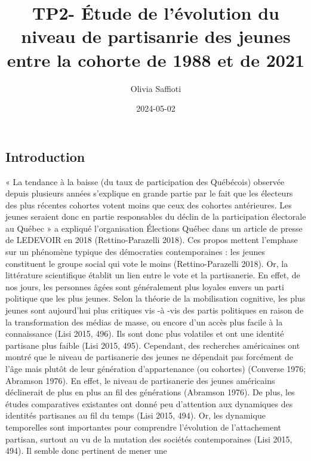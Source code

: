 \documentclass[
  letterpaper,
  DIV=11,
  numbers=noendperiod]{scrartcl}
\title{TP2- Étude de l'évolution du niveau de partisanrie des jeunes
entre la cohorte de 1988 et de 2021}
\author{Olivia Saffioti}
\date{2024-05-02}
\begin{document}
\maketitle
\ifdefined\Shaded\renewenvironment{Shaded}{\begin{tcolorbox}[boxrule=0pt, frame hidden, sharp corners, interior hidden, breakable, enhanced, borderline west={3pt}{0pt}{shadecolor}]}{\end{tcolorbox}}\fi

\hypertarget{introduction}{%
\subsection{Introduction}\label{introduction}}

« La tendance à la baisse (du taux de participation des Québécois)
observée depuis plusieurs années s'explique en grande partie par le fait
que les électeurs des plus récentes cohortes votent moins que ceux des
cohortes antérieures. Les jeunes seraient donc en partie responsables du
déclin de la participation électorale au Québec » a expliqué
l'organisation Élections Québec dans un article de presse de LEDEVOIR en
2018 (Rettino-Parazelli 2018). Ces propos mettent l'emphase sur un
phénomène typique des démocraties contemporaines : les jeunes
constituent le groupe social qui vote le moins (Rettino-Parazelli 2018).
Or, la littérature scientifique établit un lien entre le vote et la
partisanerie. En effet, de nos jours, les personnes âgées sont
généralement plus loyales envers un parti politique que les plus jeunes.
Selon la théorie de la mobilisation cognitive, les plus jeunes sont
aujourd'hui plus critiques vis -à -vis des partis politiques en raison
de la transformation des médias de masse, ou encore d'un accès plus
facile à la connaissance (Lisi 2015, 496). Ils sont donc plus volatiles
et ont une identité partisane plus faible (Lisi 2015, 495). Cependant,
des recherches américaines ont montré que le niveau de partisanerie des
jeunes ne dépendait pas forcément de l'âge mais plutôt de leur
génération d'appartenance (ou cohortes) (Converse 1976; Abramson 1976).
En effet, le niveau de partisanerie des jeunes américains déclinerait de
plus en plus an fil des générations (Abramson 1976). De plus, les études
comparatives existantes ont donné peu d'attention aux dynamiques des
identités partisanes au fil du temps (Lisi 2015, 494). Or, les dynamique
temporelles sont importantes pour comprendre l'évolution de
l'attachement partisan, surtout au vu de la mutation des sociétés
contemporaines (Lisi 2015, 494). Il semble donc pertinent de mener une
\end{document}
